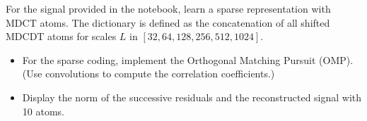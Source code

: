 \documentclass[11pt]{article}
\begin{document}
\begin{exercise}[subtitle=Sparse coding with OMP]
For the signal provided in the notebook, learn a sparse representation with MDCT atoms.
The dictionary is defined as the concatenation of all shifted MDCDT atoms for scales $L$ in $[32, 64, 128, 256, 512, 1024]$.

\begin{itemize}
    \item For the sparse coding, implement the Orthogonal Matching Pursuit (OMP). (Use convolutions to compute the correlation coefficients.)
    \item Display the norm of the successive residuals and the reconstructed signal with 10 atoms.
\end{itemize}

\end{exercise}
\end{document}
